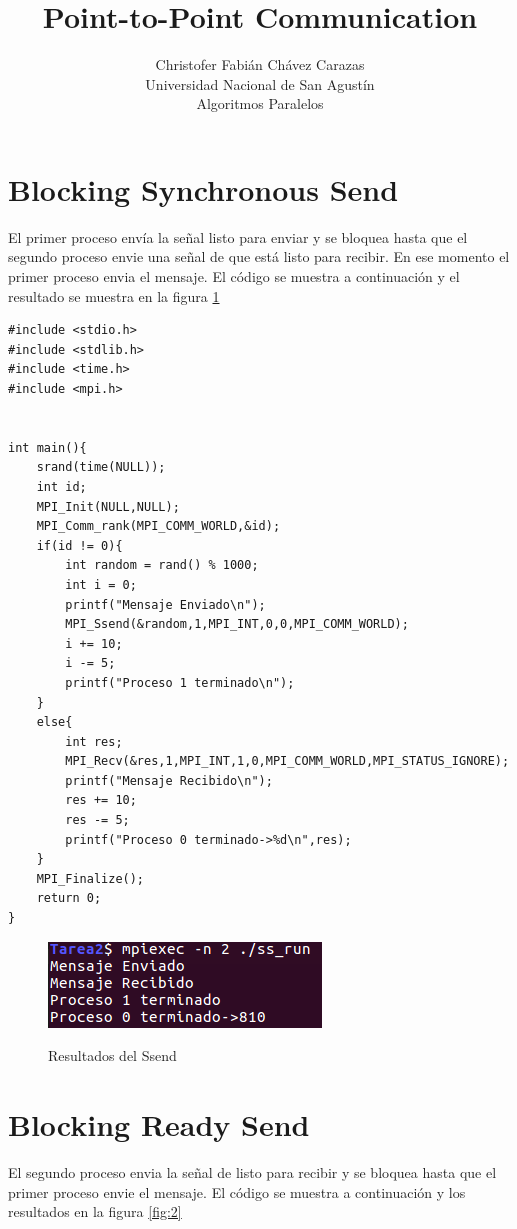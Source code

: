 \documentclass[a4paper,12pt]{article}
\begin{document}
\title{Point-to-Point Communication}
\author{
Christofer Fabián Chávez Carazas \\
\small{Universidad Nacional de San Agustín} \\
\small{Algoritmos Paralelos}
}

\maketitle

\section{Blocking Synchronous Send}

El primer proceso envía la señal listo para enviar y se bloquea hasta que el segundo proceso envie una señal de que está listo para recibir. En ese momento
el primer proceso envia el mensaje. El código se muestra a continuación y el resultado se muestra en la figura \ref{fig:1}

\begin{lstlisting}
#include <stdio.h>
#include <stdlib.h>
#include <time.h>
#include <mpi.h>


int main(){
	srand(time(NULL));
	int id;
	MPI_Init(NULL,NULL);
	MPI_Comm_rank(MPI_COMM_WORLD,&id);
	if(id != 0){
		int random = rand() % 1000;
		int i = 0;
		printf("Mensaje Enviado\n");
		MPI_Ssend(&random,1,MPI_INT,0,0,MPI_COMM_WORLD);
		i += 10;
		i -= 5;
		printf("Proceso 1 terminado\n");
	}
	else{
		int res;
		MPI_Recv(&res,1,MPI_INT,1,0,MPI_COMM_WORLD,MPI_STATUS_IGNORE);
		printf("Mensaje Recibido\n");
		res += 10;
		res -= 5;
		printf("Proceso 0 terminado->%d\n",res);
	}
	MPI_Finalize();
	return 0;
}
\end{lstlisting}

\begin{figure}
  \centering
  \includegraphics[scale = 0.7]{1.png}
  \label{fig:1}
  \caption{Resultados del Ssend}
\end{figure}


\section{Blocking Ready Send}

El segundo proceso envia la señal de listo para recibir y se bloquea hasta que el primer proceso envie el mensaje.
El código se muestra a continuación y los resultados en la figura \ref{fig:2}
\end{document}
